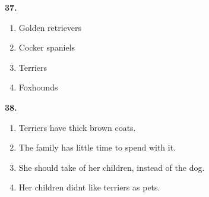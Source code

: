 \documentclass[12pt]{article}
\begin{document}
\par
\vspace{0.25\baselineskip}
\noindent\textbf{37.}
\begin{enumerate}[label=(\Alph*),leftmargin=*,itemsep=0.2em]
\item Golden retrievers
\item Cocker spaniels
\item Terriers
\item Foxhounds
\end{enumerate}
\par
\vspace{0.25\baselineskip}
\noindent\textbf{38.}
\begin{enumerate}[label=(\Alph*),leftmargin=*,itemsep=0.2em]
\item Terriers have thick brown coats.
\item The family has little time to spend with it.
\item She should take of her children, instead of the dog.
\item Her children didnt like terriers as pets.
\end{enumerate}
\par
\vspace{0.25\baselineskip}
\end{document}
